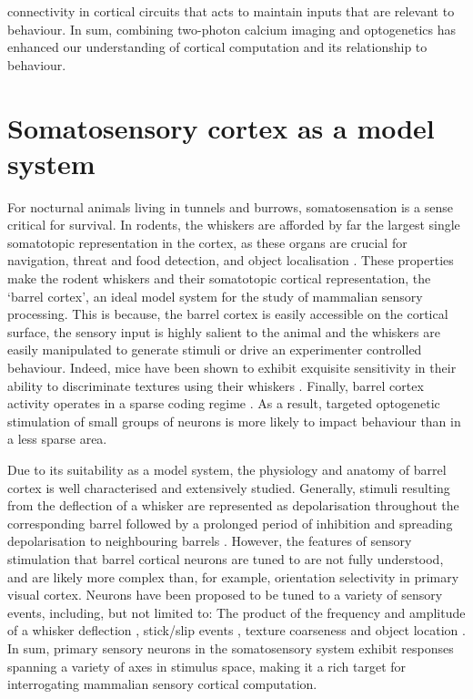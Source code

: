 connectivity in cortical circuits that acts to maintain inputs that are relevant to behaviour. In sum, combining two-photon calcium imaging and optogenetics has enhanced our understanding of cortical computation and its relationship to behaviour. 

\section{Somatosensory cortex as a model system}

For nocturnal animals living in tunnels and burrows, somatosensation is a sense critical for survival. In rodents, the whiskers are afforded by far the largest single somatotopic representation in the cortex, as these organs are crucial for navigation, threat and food detection, and object localisation \cite{gustafson_behavioral_1977}. These properties make the rodent whiskers and their somatotopic cortical representation, the ‘barrel cortex’, an ideal model system for the study of mammalian sensory processing. This is because, the barrel cortex is easily accessible on the cortical surface, the sensory input is highly salient to the animal and the whiskers are easily manipulated to generate stimuli or drive an experimenter controlled behaviour. Indeed, mice have been shown to exhibit exquisite sensitivity in their ability to discriminate textures using their whiskers \cite{wu_novel_2013}. Finally, barrel cortex activity operates in a sparse coding regime \cite{crochet_synaptic_2011}. As a result, targeted optogenetic stimulation of small groups of neurons is more likely to impact behaviour than in a less sparse area.

Due to its suitability as a model system, the physiology \cite{feldmeyer_barrel_2013} and anatomy \cite{petersen_functional_2007} of barrel cortex is well characterised and extensively studied. Generally, stimuli resulting from the deflection of a whisker are represented as depolarisation throughout the corresponding barrel \cite{crochet_synaptic_2011} followed by a prolonged period of inhibition \cite{simons_response_1978} and spreading depolarisation to neighbouring barrels \cite{ferezou_visualizing_2006}. However, the features of sensory stimulation that barrel cortical neurons are tuned to are not fully understood, and are likely more complex than, for example, orientation selectivity in primary visual cortex. Neurons have been proposed to be tuned to a variety of sensory events, including, but not limited to: The product of the frequency and amplitude of a whisker deflection \cite{arabzadeh_encoding_2003}, stick/slip events \cite{jadhav_sparse_2009}, texture coarseness \cite{garion_texture_2014} and object location \cite{oconnor_neural_2010}. In sum, primary sensory neurons in the somatosensory system exhibit responses spanning a variety of axes in stimulus space, making it a rich target for interrogating mammalian sensory cortical computation. 


